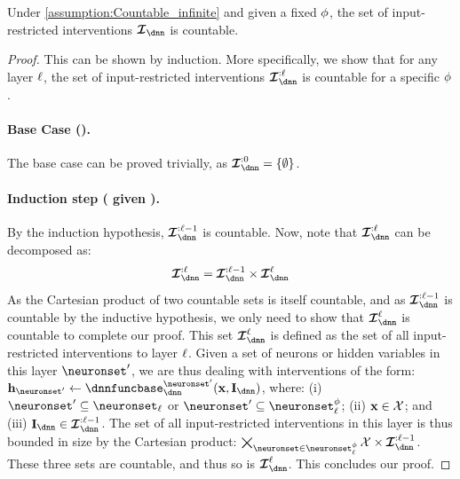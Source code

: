 \begin{lemma}\label{theorem:interventions_countable_infinite}
    Under \cref{assumption:Countable_infinite} and given a fixed $\phi$, the set of input-restricted interventions $\interventionsset_{\dnn}$ is countable.
\end{lemma}
\begin{proof}
    This can be shown by induction. More specifically, we show that for any layer $\layer$, the set of input-restricted interventions $\interventionsset_{\dnn}^{:\layer}$ is countable for a specific $\phi$.
    
    \paragraph{Base Case ().} 
    The base case can be proved trivially, as $\interventionsset_{\dnn}^{:0} = \{\emptyset\}$.
    
    \paragraph{Induction step (\boldsymbol{$\layer$} given ).}
    By the induction hypothesis, $\interventionsset_{\dnn}^{:\layer-1}$ is countable. 
    Now, note that $\interventionsset_{\dnn}^{:\layer}$ can be decomposed as:
    \begin{align}
        \interventionsset_{\dnn}^{:\layer} = \interventionsset_{\dnn}^{:\layer-1} \times \interventionsset_{\dnn}^{\layer}
    \end{align}
    As the Cartesian product of two countable sets is itself countable, and as $\interventionsset_{\dnn}^{:\layer-1}$ is countable by the inductive hypothesis, we only need to show that $\interventionsset_{\dnn}^{\layer}$ is countable to complete our proof.
    This set $\interventionsset_{\dnn}^{\layer}$ is defined as the set of all input-restricted interventions to layer $\layer$.
    Given a set of neurons or hidden variables in this layer $\neuronset'$,
    we are thus dealing with interventions of the form: 
    $\hiddenstates_{\neuronset'} \leftarrow \dnnfunclayer{\neuronset'}(\bx, \interventions_{\dnn})$, where: 
    (i) $\neuronset' \subseteq \neuronset_{\layer}$ or $\neuronset' \subseteq \neuronset^{\causalmap}_{\layer}$;
    (ii) $\mathbf{x} \in \mathcal{X}$; and
    (iii) $\interventions_{\dnn} \in \interventionsset_{\dnn}^{:\layer-1}$.
    The set of all input-restricted interventions in this layer is thus bounded in size by the Cartesian product:
    $\bigtimes_{\neuronset \in \neuronset^{\causalmap}_{\layer}} \calX \times \interventionsset_{\dnn}^{:\layer-1}$.
    These three sets are countable, and thus so is $\interventionsset_{\dnn}^{\layer}$.
    This concludes our proof.
\end{proof}

